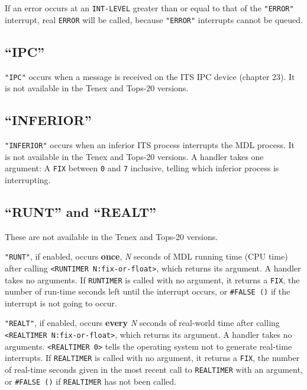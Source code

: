 \documentclass[a4paper]{scrbook}
\begin{document}
If an error occurs at an \texttt{INT-LEVEL} greater than or equal to that of the \texttt{"ERROR"} interrupt, real
\texttt{ERROR} will be called, because \texttt{"ERROR"} interrupts cannot be queued.

\subsection{\texorpdfstring{``IPC''}{21.8.12. IPC}}\label{ipc}

\texttt{"IPC"}  occurs when a message is received on the ITS IPC device
(chapter 23). It is not available in the Tenex and Tops-20 versions.

\subsection{\texorpdfstring{``INFERIOR''}{21.8.13. INFERIOR}}\label{inferior}

\texttt{"INFERIOR"}  occurs when an inferior ITS process interrupts
the MDL process. It is not available in the Tenex and Tops-20 versions. A
handler takes one argument: A \texttt{FIX} between \texttt{0} and \texttt{7} inclusive, telling which inferior process is
interrupting.

\subsection{\texorpdfstring{``RUNT'' and ``REALT''}{21.8.14. RUNT and REALT}}\label{runt-and-realt}

These are not available in the Tenex and Tops-20 versions.

\texttt{"RUNT"},  if enabled, occurs \textbf{once}, \emph{N} seconds of MDL running time
(CPU time) after calling \texttt{\textless{}RUNTIMER\ N:fix-or-float\textgreater{}}, which
returns its argument. A handler takes no arguments. If \texttt{RUNTIMER} is called with no argument, it returns a
\texttt{FIX}, the number of run-time seconds left until the interrupt occurs, or \texttt{\#FALSE\ ()} if the interrupt is
not going to occur.

\texttt{"REALT"},  if enabled, occurs \textbf{every} \emph{N} seconds of real-world time
after calling \texttt{\textless{}REALTIMER\ N:fix-or-float\textgreater{}}, which returns
its argument. A handler takes no arguments. \texttt{\textless{}REALTIMER\ 0\textgreater{}} tells the operating system not
to generate real-time interrupts. If \texttt{REALTIMER} is called with no argument, it returns a \texttt{FIX}, the number
of real-time seconds given in the most recent call to \texttt{REALTIMER} with an argument, or \texttt{\#FALSE\ ()} if
\texttt{REALTIMER} has not been called.
\end{document}
